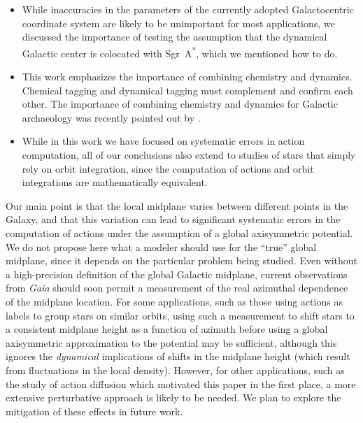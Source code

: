 \documentclass[twocolumn]{aastex62}
\newcommand{\sgra}{Sgr~A\textsuperscript{*}}
\begin{document}
\begin{itemize}
\item While inaccuracies in the parameters of the currently adopted
Galactocentric coordinate system are likely to be unimportant for most
applications, we discussed the importance of testing the assumption that the
dynamical Galactic center is colocated with \sgra{}, which we mentioned how to
do.

\item This work emphasizes the importance of combining chemistry and dynamics.
Chemical tagging \citep{2002ARA&A..40..487F} and dynamical tagging must
complement and confirm each other. The importance of combining chemistry and
dynamics for Galactic archaeology was recently pointed out by
\citet{2019arXiv190210719K}.

\item While in this work we have focused on systematic errors in action
computation, all of our conclusions also extend to studies of stars that
simply rely on orbit integration, since the computation of actions and orbit
integrations are mathematically equivalent.

\end{itemize}

Our main point is that the local midplane varies between different points in
the Galaxy, and that this variation can lead to significant systematic errors
in the computation of actions under the assumption of a global axisymmetric
potential. We do not propose here what a modeler should use for the ``true''
global midplane, since it depends on the particular problem being studied.
Even without a high-precision definition of the global Galactic midplane,
current observations from \textit{Gaia} should soon permit a measurement of the
real azimuthal dependence of the midplane location. For some applications,
such as those using actions as labels to group stars on similar orbits, using
such a measurement to shift stars to a consistent midplane height as a
function of azimuth before using a global axisymmetric approximation to the
potential may be sufficient, although this ignores the \emph{dynamical}
implications of shifts in the midplane height (which result from fluctuations
in the local density). However, for other applications, such as the study of
action diffusion which motivated this paper in the first place, a more
extensive perturbative approach is likely to be needed. We plan to explore the
mitigation of these effects in future work.
\end{document}
